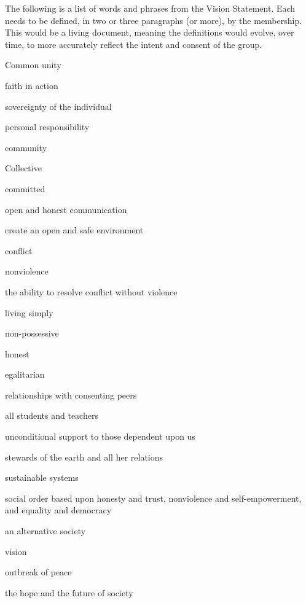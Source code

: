The following is a list of words and phrases from the Vision Statement. Each needs to be defined, in two or three paragraphs (or more), by the membership. This would be a living document, meaning the definitions would evolve, over time, to more accurately reflect the intent and consent of the group.


\squishitemize%
\item Common unity
\item faith in action
\item sovereignty of the individual
\item personal responsibility
\item community
\item Collective
\item committed
\item open and honest communication
\item create an open and safe environment
\item conflict
\item nonviolence
\item the ability to resolve conflict without violence
\item living simply
\item non-possessive
\item honest
\item egalitarian
\item relationships with consenting peers
\item all students and teachers
\item unconditional support to those dependent upon us
\item stewards of the earth and all her relations
\item sustainable systems
\item social order based upon honesty and trust, nonviolence and self-empowerment, and equality and democracy
\item an alternative society
\item vision
\item outbreak of peace
\item the hope and the future of society
\squishend%